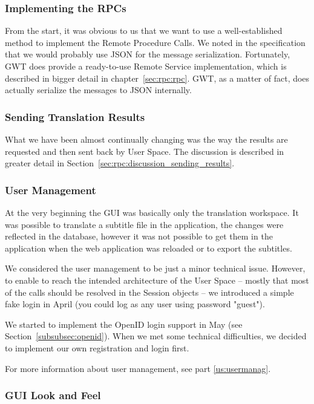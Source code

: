 \subsubsection{Implementing the RPCs}

From the start, it was obvious to us that we want to use a well-established method to implement the Remote Procedure Calls.
We noted in the specification that we would probably use JSON for the message serialization.
Fortunately, GWT does provide a ready-to-use Remote Service implementation, which is described in bigger detail in chapter~\ref{sec:rpc:rpc}. GWT,  as a matter of fact, does actually serialize the messages to JSON internally.


\subsubsection{Sending Translation Results}

What we have been almost continually changing was the way the results are requested and then sent back by User Space. The discussion is described in greater detail in Section~\ref{sec:rpc:discussion_sending_results}.

\subsubsection{User Management}

At the very beginning the GUI was basically only the translation workspace. It was possible to translate a subtitle file in the application, the changes were reflected in the database, however it was not possible to get them in the application when the web application was reloaded or to export the subtitles.

We considered the user management to be just a minor technical issue. However, to enable to reach the intended architecture of the User Space -- mostly that most of the calls should be resolved in the Session objects -- we introduced a simple fake login in April (you could log as any user using password "guest").

We started to implement the OpenID login support in May (see Section~\ref{subsubsec:openid}). When we met some technical difficulties, we decided to implement our own registration and login first.

For more information about user management, see part \ref{us:usermanag}.

\subsubsection{GUI Look and Feel}

